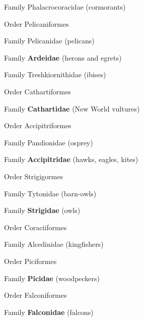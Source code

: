 \documentclass[10pt]{article}
\newlength\mylength
\newcommand*{\growparindent}{\addtolength{\parindent}{\mylength}}
\newcommand*{\reduceparindent}{\addtolength{\parindent}{-1\mylength}}
\begin{document}
\begin{multicols}{2}
\begin{spacing}{1.35}
      	\growparindent
      
      	Family Phalacrocoracidae (cormorants)
      	
      \reduceparindent
      
      Order Pelicaniformes
      
      	\growparindent
      	
      	Family Pelicanidae (pelicans)
      	
      	Family \textbf{Ardeidae} (herons and egrets)
      	
      	Family Treshkiornithidae (ibises)
      	
      \reduceparindent
      
      Order Cathartiformes
      
      	\growparindent
      
      	Family \textbf{Cathartidae} (New World vultures)
      	
      \reduceparindent
      
      Order Accipitriformes
      
      	\growparindent
      	
      	Family Pandionidae (osprey)
      	
      	Family \textbf{Accipitridae} (hawks, eagles, kites)
      	
      \reduceparindent
      
      Order Strigigormes
      
      	\growparindent
      	
      	Family Tytonidae (barn-owls)
      	
      	Family \textbf{Strigidae} (owls)
      	
      \reduceparindent
      
      Order Coraciiformes
      
      	\growparindent
      	
      	Family Alcedinidae (kingfishers)
      	
      \reduceparindent
      
      Order Piciformes
      
      	\growparindent
      	
      	Family \textbf{Picidae} (woodpeckers)
      	
	  \reduceparindent
	  
	  Order Falconiformes
	  
	  	\growparindent
	  	
	  	Family \textbf{Falconidae} (falcons)
	  	

\end{spacing}
\end{multicols}
\end{document}
